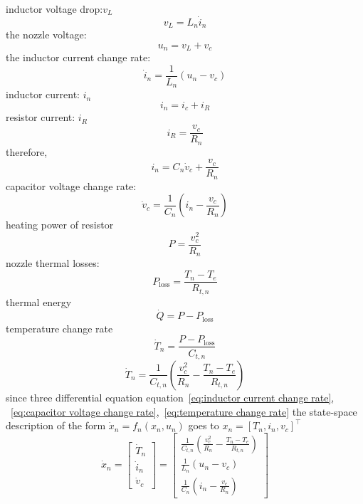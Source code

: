 \documentclass{article}
\begin{document}
inductor voltage drop:$v_L$
\begin{equation}v_L=L_n\dot{i}_n\end{equation}
the nozzle voltage: 
\begin{equation}u_n=v_L+v_c\end{equation}
the inductor current change rate:\begin{equation}\dot{i}_n=\frac{1}{L_n}\left(u_n-v_c\right)\label{eq:inductor current change rate}\end{equation}
inductor current: $i_n$\\
\begin{equation}i_n=i_c+i_R\end{equation}
resistor current: $i_R$
\begin{equation}i_R=\frac{v_c}{R_n}\end{equation}
therefore, \begin{equation}i_n=C_n\dot{v}_c+\frac{v_c}{R_n}\end{equation}
capacitor voltage change rate: \begin{equation}\dot{v}_c=\frac{1}{C_n}\left({i_n}-\frac{v_c}{R_n}\right)\label{eq:capacitor voltage change rate}\end{equation}
heating power of resistor \begin{equation}P=\frac{v_c^2}{R_n}\end{equation}
nozzle thermal losses: \begin{equation}P_\mathrm{loss}=\frac{T_n-T_e}{R_{t,n}}\end{equation}
thermal energy \begin{equation}\dot{Q}=P-P_\mathrm{loss}\end{equation}
temperature change rate \begin{equation}
\dot{T}_n=\frac{P-P_\mathrm{loss}}{C_{t,n}}\end{equation}
\begin{equation}
\dot{T}_n=\frac{1}{C_{t,n}}\left(\frac{v_c^2}{R_n}-\frac{T_n-T_e}{R_{t,n}}\right)\label{eq:temperature change rate}\end{equation}
since three differential equation equation~\eqref{eq:inductor current change rate}, ~\eqref{eq:capacitor voltage change rate},~\eqref{eq:temperature change rate}
the state-space description of the form $\dot{x}_n=f_n\left(x_n,u_n\right)$ goes to $x_n=[{T_n},{i_n},{v_c}]^\top$
\begin{equation}
\dot{x}_n=
\begin{bmatrix}
    \dot{T}_n\\
    \dot{i}_n\\
    \dot{v}_c
\end{bmatrix}=
\begin{bmatrix}
    \frac{1}{C_{t,n}}\left(\frac{v_c^2}{R_n}-\frac{T_n-T_e}{R_{t,n}}\right)\\
    \frac{1}{L_n}\left(u_n-v_c\right)\\
    \frac{1}{C_n}\left({i_n}-\frac{v_c}{R_n}\right)
\end{bmatrix}
\end{equation}
\end{document}
